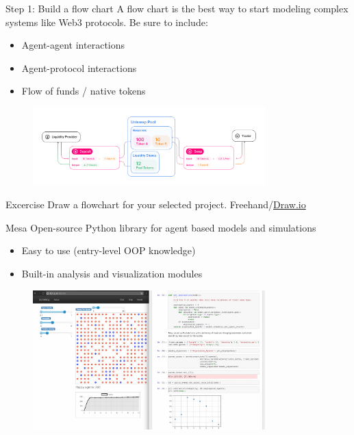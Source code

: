 \documentclass{beamer}
\begin{document}
\begin{frame}{Step 1: Build a flow chart}
    A flow chart is the best way to start modeling complex systems like Web3 protocols. Be sure to include:
    \begin{itemize}
        \item Agent-agent interactions
        \item Agent-protocol interactions
        \item Flow of funds / native tokens
    \end{itemize}
    
    \begin{figure}
        \centering
        \includegraphics[width=0.8\textwidth]{figures/uni_flowchart.jpg}
    \end{figure}

    \begin{block}{Excercise}
        Draw a flowchart for your selected project. Freehand/\href{https://www.drawio.com/example-diagrams}{Draw.io}
    \end{block}
\end{frame}

\begin{frame}{Mesa}
    Open-source Python library for agent based models and simulations\\
    \begin{itemize}
        \item Easy to use (entry-level OOP knowledge)
        \item Built-in analysis and visualization modules
    \end{itemize}
    \begin{figure}
        \centering
        \includegraphics[width=0.8\textwidth]{figures/Mesa_Screenshot.png}
    \end{figure}
\end{frame}
\end{document}
